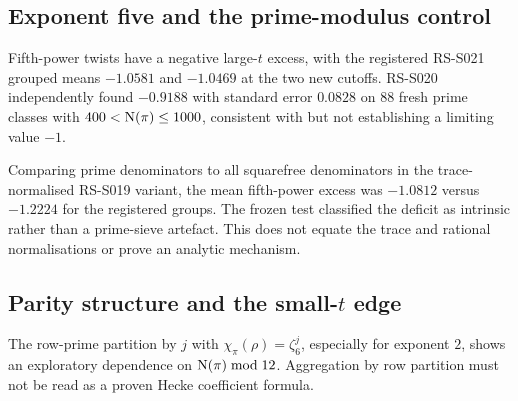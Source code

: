 \subsection{Exponent five and the prime-modulus control}
Fifth-power twists have a negative large-\(t\) excess,
with the registered RS-S021 grouped means
\(-1.0581\) and \(-1.0469\) at the two new cutoffs.
RS-S020 independently found \(-0.9188\) with standard
error \(0.0828\) on \(88\) fresh prime classes
with \(400<\operatorname{N}(\pi)\le1000\), consistent with but not
establishing a limiting value \(-1\).

Comparing prime denominators to all squarefree denominators
in the trace-normalised RS-S019 variant, the mean fifth-power
excess was \(-1.0812\) versus \(-1.2224\) for the registered
groups. The frozen test classified the deficit as intrinsic
rather than a prime-sieve artefact. This does not equate the
trace and rational normalisations or prove an analytic mechanism.

\subsection{Parity structure and the small-\(t\) edge}
The row-prime partition by \(j\) with
\(\chi_\pi(\rho)=\zeta_6^j\), especially for exponent \(2\),
shows an exploratory dependence on
\(\operatorname{N}(\pi)\bmod12\). Aggregation by row partition
must not be read as a proven Hecke coefficient formula.

